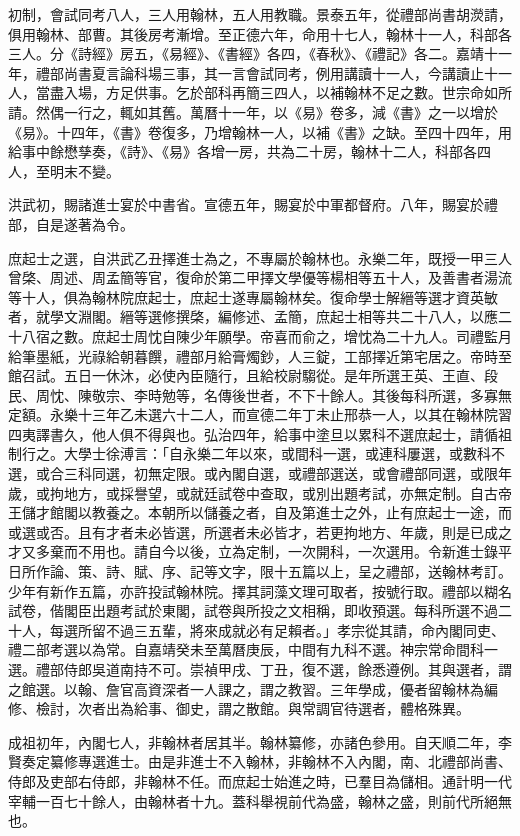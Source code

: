 初制，會試同考八人，三人用翰林，五人用教職。景泰五年，從禮部尚書胡濙請，俱用翰林、部曹。其後房考漸增。至正德六年，命用十七人，翰林十一人，科部各三人。分《詩經》房五，《易經》、《書經》各四，《春秋》、《禮記》各二。嘉靖十一年，禮部尚書夏言論科場三事，其一言會試同考，例用講讀十一人，今講讀止十一人，當盡入場，方足供事。乞於部科再簡三四人，以補翰林不足之數。世宗命如所請。然偶一行之，輒如其舊。萬曆十一年，以《易》卷多，減《書》之一以增於《易》。十四年，《書》卷復多，乃增翰林一人，以補《書》之缺。至四十四年，用給事中餘懋孳奏，《詩》、《易》各增一房，共為二十房，翰林十二人，科部各四人，至明末不變。

洪武初，賜諸進士宴於中書省。宣德五年，賜宴於中軍都督府。八年，賜宴於禮部，自是遂著為令。

庶起士之選，自洪武乙丑擇進士為之，不專屬於翰林也。永樂二年，既授一甲三人曾棨、周述、周孟簡等官，復命於第二甲擇文學優等楊相等五十人，及善書者湯流等十人，俱為翰林院庶起士，庶起士遂專屬翰林矣。復命學士解縉等選才資英敏者，就學文淵閣。縉等選修撰棨，編修述、孟簡，庶起士相等共二十八人，以應二十八宿之數。庶起士周忱自陳少年願學。帝喜而俞之，增忱為二十九人。司禮監月給筆墨紙，光祿給朝暮饌，禮部月給膏燭鈔，人三錠，工部擇近第宅居之。帝時至館召試。五日一休沐，必使內臣隨行，且給校尉騶從。是年所選王英、王直、段民、周忱、陳敬宗、李時勉等，名傳後世者，不下十餘人。其後每科所選，多寡無定額。永樂十三年乙未選六十二人，而宣德二年丁未止邢恭一人，以其在翰林院習四夷譯書久，他人俱不得與也。弘治四年，給事中塗旦以累科不選庶起士，請循祖制行之。大學士徐溥言：「自永樂二年以來，或間科一選，或連科屢選，或數科不選，或合三科同選，初無定限。或內閣自選，或禮部選送，或會禮部同選，或限年歲，或拘地方，或採譽望，或就廷試卷中查取，或別出題考試，亦無定制。自古帝王儲才館閣以教養之。本朝所以儲養之者，自及第進士之外，止有庶起士一途，而或選或否。且有才者未必皆選，所選者未必皆才，若更拘地方、年歲，則是已成之才又多棄而不用也。請自今以後，立為定制，一次開科，一次選用。令新進士錄平日所作論、策、詩、賦、序、記等文字，限十五篇以上，呈之禮部，送翰林考訂。少年有新作五篇，亦許投試翰林院。擇其詞藻文理可取者，按號行取。禮部以糊名試卷，偕閣臣出題考試於東閣，試卷與所投之文相稱，即收預選。每科所選不過二十人，每選所留不過三五輩，將來成就必有足賴者。」孝宗從其請，命內閣同吏、禮二部考選以為常。自嘉靖癸未至萬曆庚辰，中間有九科不選。神宗常命間科一選。禮部侍郎吳道南持不可。崇禎甲戌、丁丑，復不選，餘悉遵例。其與選者，謂之館選。以翰、詹官高資深者一人課之，謂之教習。三年學成，優者留翰林為編修、檢討，次者出為給事、御史，謂之散館。與常調官待選者，體格殊異。

成祖初年，內閣七人，非翰林者居其半。翰林纂修，亦諸色參用。自天順二年，李賢奏定纂修專選進士。由是非進士不入翰林，非翰林不入內閣，南、北禮部尚書、侍郎及吏部右侍郎，非翰林不任。而庶起士始進之時，已羣目為儲相。通計明一代宰輔一百七十餘人，由翰林者十九。蓋科舉視前代為盛，翰林之盛，則前代所絕無也。

